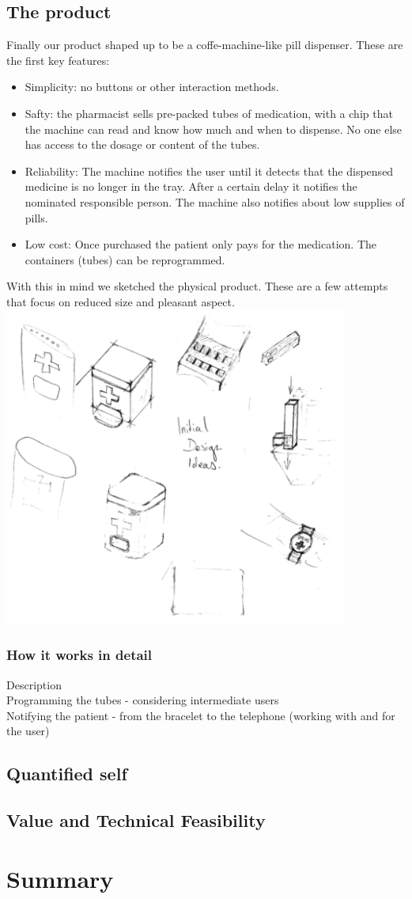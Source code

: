 \documentclass[12pt]{article}
\begin{document}
	\subsection{The product}
	Finally our product shaped up to be a coffe-machine-like pill dispenser. These are the first key features:
	\begin{itemize}
	\item Simplicity: no buttons or other interaction methods.
	\item Safty: the pharmacist sells pre-packed tubes of medication, with a chip that the machine can read and know how much and when to dispense. No one else has access to the dosage or content of the tubes.
	\item Reliability: The machine notifies the user until it detects that the dispensed medicine is no longer in the tray. After a certain delay it notifies the nominated responsible person. The machine also notifies about low supplies of pills.
	\item Low cost: Once purchased the patient only pays for the medication. The containers (tubes) can be reprogrammed.
	\end{itemize}
	With this in mind we sketched the physical product. These are a few attempts that focus on reduced size and pleasant aspect. \\
	\includegraphics[width=0.85\textwidth]{product.png}

	\subsubsection*{How it works in detail}
	Description \\
	Programming the tubes - considering intermediate users \\
	Notifying the patient - from the bracelet to the telephone (working with and for the user)

	\subsection{Quantified self}
	\subsection{Value and Technical Feasibility}

\section{Summary}
\end{document}
